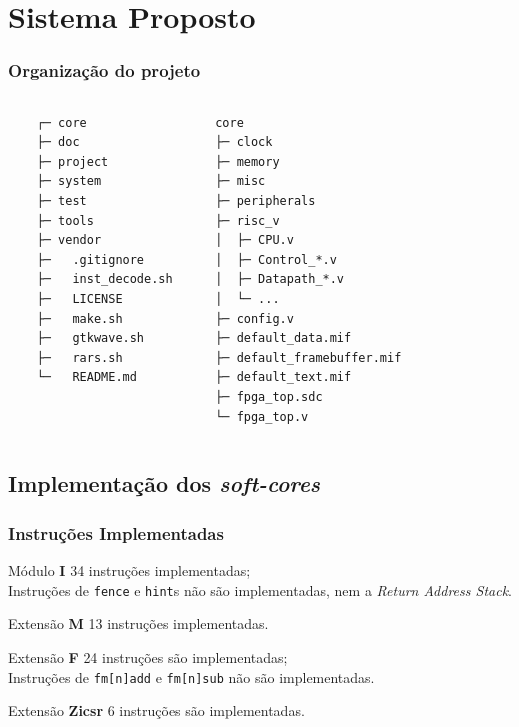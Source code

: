 \documentclass[aspectratio=169]{beamer}
\begin{document}
\section{Sistema Proposto}
    \begin{frame}[fragile]
        \frametitle{Organização do projeto}
        \footnotesize{
        \begin{columns}
            \begin{verbatim}
    ┌─ core
    ├─ doc
    ├─ project
    ├─ system
    ├─ test
    ├─ tools
    ├─ vendor
    ├─   .gitignore
    ├─   inst_decode.sh
    ├─   LICENSE
    ├─   make.sh
    ├─   gtkwave.sh
    ├─   rars.sh
    └─   README.md
        \end{verbatim}
        \vfill
        \begin{verbatim}
   core
   ├─ clock
   ├─ memory
   ├─ misc
   ├─ peripherals
   ├─ risc_v
   │  ├─ CPU.v
   │  ├─ Control_*.v
   │  ├─ Datapath_*.v
   │  └─ ...
   ├─ config.v
   ├─ default_data.mif
   ├─ default_framebuffer.mif
   ├─ default_text.mif
   ├─ fpga_top.sdc
   └─ fpga_top.v
        \end{verbatim}
        \vfill
        \end{columns}}
    \end{frame}

    \subsection{Implementação dos \textit{soft-cores}}
    \begin{frame}
        \frametitle{Instruções Implementadas}
        \begin{block}{Módulo \textbf{I}}
            {34 instruções implementadas;\\
                Instruções de \texttt{fence} e \texttt{hint}s não são implementadas,
                nem a \textit{Return Address Stack}.
            }
        \end{block}
        \begin{block}{Extensão \textbf{M}}
            {13 instruções implementadas.}
        \end{block}
        \begin{block}{Extensão \textbf{F}}
            {24 instruções são implementadas;\\
                Instruções de \texttt{fm[n]add} e \texttt{fm[n]sub} não são implementadas.
            }
        \end{block}
        \begin{block}{Extensão \textbf{Zicsr}}
            {6 instruções são implementadas.}
        \end{block}
    \end{frame}
\end{document}
